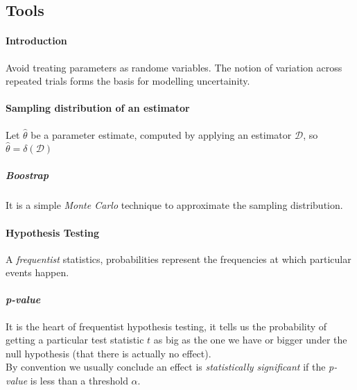 \subsection{Tools}

\paragraph{Introduction}
Avoid treating parameters as randome variables.
The notion of variation across repeated trials forms the basis for modelling
uncertainity.

\paragraph{Sampling distribution of an estimator}
Let $\hat{\theta}$ be a parameter estimate, computed by applying an estimator
$\mathcal{D}$, so $\hat{\theta}=\delta(\mathcal{D})$ 

\subparagraph{Boostrap}
It is a simple \emph{Monte Carlo} technique to approximate the sampling 
distribution.

\paragraph{Hypothesis Testing}
A \emph{frequentist} statistics, probabilities represent the frequencies at which 
particular events happen.

\paragraph{\emph{p-value}}
It is the heart of frequentist hypothesis testing, it tells us the probability of getting
a particular test statistic $t$ as big as the one we have or bigger under the null 
hypothesis (that there is actually no effect).\\
By convention we usually conclude an effect is \emph{statistically significant} if the 
\emph{p-value} is less than a threshold $\alpha$.

